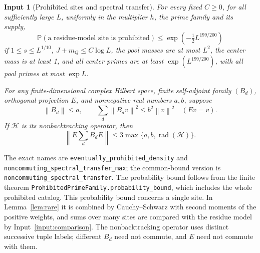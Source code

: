 \documentclass[11pt]{article}
\newtheorem{inputthm}[theorem]{Input}
\theoremstyle{definition}
\newcommand{\Prob}{\mathbb P}
\newcommand{\leanname}[1]{\nolinkurl{#1}}
\newcommand{\norm}[1]{\left\lVert#1\right\rVert}
\DeclareMathOperator{\rad}{rad}
\begin{document}
\begin{inputthm}[Prohibited sites and spectral transfer]\label{input:bad-spectral}
For every fixed $C\ge0$, for all sufficiently large $L$, uniformly in
the multiplier $h$, the prime family and its supply,
\begin{equation}\label{eq:badprob}
 \Prob(\text{a residue-model site is prohibited})
 \le\exp(-\tfrac12 L^{199/200})
\end{equation}
if $1\le s\le L^{1/10}$, $J+m_Q\le C\log L$, the pool masses are
at most $L^2$, the center mass is at least 1, and all center primes
are at least $\exp(L^{199/200})$, with all pool primes at most $\exp L$.

For any finite-dimensional complex Hilbert space, finite self-adjoint
family $(B_d)$, orthogonal projection $E$, and nonnegative real
numbers $a,b$, suppose
\[
 \norm{B_d}\le a,\qquad
 \sum_d\norm{B_dv}^2\le b^2\norm v^2\quad(Ev=v).
\]
If $\mathcal H$ is its nonbacktracking operator, then
\begin{equation}\label{eq:spectralinput}
 \norm{E\sum_d B_d E}\le3\max\{a,b,\rad(\mathcal H)\}.
\end{equation}
\end{inputthm}
The exact names are \leanname{eventually_prohibited_density} and
\leanname{noncommuting_spectral_transfer_max}; the common-bound version
is \leanname{noncommuting_spectral_transfer}.
The probability bound follows from the finite theorem
\leanname{ProhibitedPrimeFamily.probability_bound}, which includes the
whole prohibited catalog. This probability bound concerns a single site. In Lemma~\ref{lem:rare}
it is combined by Cauchy--Schwarz with second moments of the positive
weights, and sums over many sites are compared with the residue model
by Input~\ref{input:comparison}.
The nonbacktracking operator uses distinct successive tuple labels;
different $B_d$ need not commute, and $E$ need not commute with them.
\end{document}
